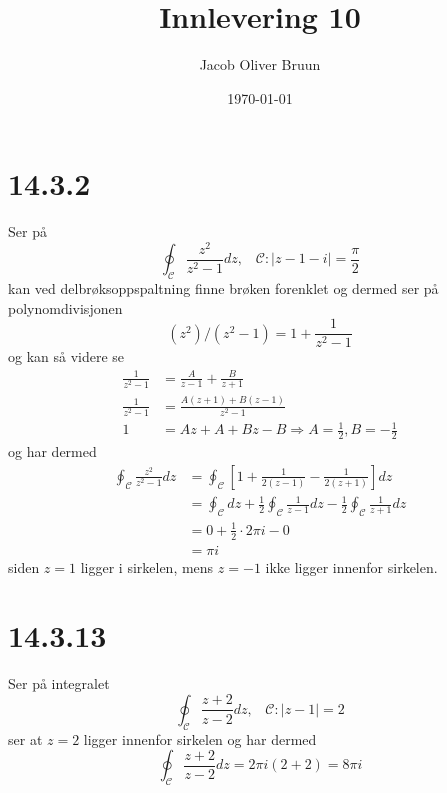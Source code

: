 \documentclass{report}
\title{Innlevering 10}
\author{Jacob Oliver Bruun}
\date{\today}
\newcommand{\nbrack}[1]{\left( #1 \right)}
\newcommand{\bbrack}[1]{\left[ #1 \right]}
\begin{document}
\section*{14.3.2}
Ser på
\begin{equation}
  \label{eq:1}
  \oint_{\mathcal{C}} \frac{z^{2}}{z^{2} - 1} dz, \;\;\; \mathcal{C} : |z - 1 - i| = \frac{\pi}{2}
\end{equation}
kan ved delbrøksoppspaltning finne brøken forenklet og dermed ser på polynomdivisjonen
\begin{equation}
  \label{eq:3}
  \nbrack{z^{2}} / \nbrack{z^{2} - 1} = 1 + \frac{1}{z^{2} - 1}
\end{equation}
og kan så videre se
\begin{equation}
  \label{eq:2}
  \begin{split}
    \frac{1}{z^{2} - 1} &= \frac{A}{z-1} + \frac{B}{z+1} \\
    \frac{1}{z^{2} - 1} &= \frac{A(z+1) + B(z-1)}{z^{2} - 1} \\
    1 &= Az + A + Bz - B \Rightarrow A = \frac{1}{2}, B = -\frac{1}{2}
  \end{split}
\end{equation}
og har dermed
\begin{equation}
  \label{eq:4}
  \begin{split}
    \oint_{\mathcal{C}} \frac{z^{2}}{z^{2} - 1} dz
    &= \oint_{\mathcal{C}} \bbrack{ 1 + \frac{1}{2(z-1)} - \frac{1}{2(z+1)} }dz \\
    &= \oint_{\mathcal{C}} dz + \frac{1}{2} \oint_{\mathcal{C}} \frac{1}{z-1} dz - \frac{1}{2} \oint_{\mathcal{C}} \frac{1}{z+1} dz \\
    &= 0 + \frac{1}{2} \cdot 2\pi i - 0 \\
    &= \pi i
  \end{split}
\end{equation}
siden $z=1$ ligger i sirkelen, mens $z=-1$ ikke ligger innenfor sirkelen.


\section*{14.3.13}
Ser på integralet
\begin{equation}
  \label{eq:5}
  \oint_{\mathcal{C}} \frac{z+2}{z-2} dz, \;\;\; \mathcal{C} : |z - 1| = 2
\end{equation}
ser at $z=2$ ligger innenfor sirkelen og har dermed
\begin{equation}
  \label{eq:6}
  \oint_{\mathcal{C}} \frac{z+2}{z-2} dz = 2\pi i (2 + 2) = 8\pi i
\end{equation}
\end{document}
